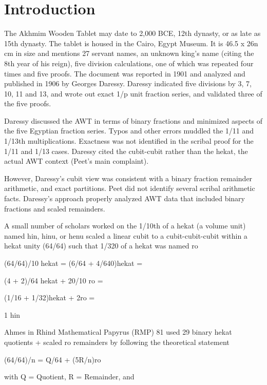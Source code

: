 \documentclass[12pt]{article}
\begin{document}
\section{Introduction}

The Akhmim Wooden Tablet may date to 2,000 BCE, 12th dynasty, or as late as 15th dynasty. The tablet is housed in the Cairo, Egypt Museum. It is 46.5 x 26n cm in size and mentions 27 servant names, an unknown king's name (citing the 8th year of his reign), five division calculations, one of which was repeated four times and five proofs. The document was reported in 1901 and analyzed and published in 1906 by Georges Daressy. Daressy indicated five divisions by 3, 7, 10, 11 and 13, and wrote out exact 1/p unit fraction series, and validated three of the five proofs.

Daressy discussed the AWT in terms of binary fractions and minimized aspects of the five Egyptian fraction series. Typos and other errors muddled the 1/11 and 1/13th multiplications. Exactness was not identified in the scribal proof for the 1/11 and 1/13 cases. Daressy cited the cubit-cubit rather than the hekat, the actual AWT context (Peet's main complaint).

However, Daressy's cubit view was consistent with a binary fraction remainder arithmetic, and exact partitions. Peet did not identify several scribal arithmetic facts. Daressy's approach properly analyzed AWT data that included binary fractions and scaled remainders.

A small number of scholars worked on the 1/10th of a hekat (a volume unit) named hin, hinu, or henu scaled a linear cubit to a cubit-cubit-cubit within a hekat unity (64/64) such that 1/320 of a hekat was named ro

(64/64)/10 hekat = (6/64 + 4/640)hekat =

(4 + 2)/64 hekat + 20/10 ro =

(1/16 + 1/32)hekat + 2ro =

1 hin

Ahmes in Rhind Mathematical Papyrus (RMP) 81 used 29 binary hekat quotients + scaled ro remainders by following the theoretical statement

(64/64)/n = Q/64 + (5R/n)ro

with Q = Quotient, R = Remainder, and
\end{document}
